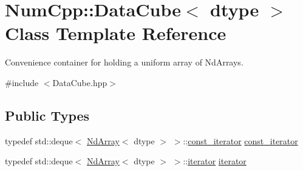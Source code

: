 \hypertarget{class_num_cpp_1_1_data_cube}{}\section{Num\+Cpp\+:\+:Data\+Cube$<$ dtype $>$ Class Template Reference}
\label{class_num_cpp_1_1_data_cube}


Convenience container for holding a uniform array of Nd\+Arrays.  




{\ttfamily \#include $<$Data\+Cube.\+hpp$>$}

\subsection*{Public Types}
\begin{DoxyCompactItemize}
\item 
typedef std\+::deque$<$ \mbox{\hyperlink{class_num_cpp_1_1_nd_array}{Nd\+Array}}$<$ dtype $>$ $>$\+::\mbox{\hyperlink{class_num_cpp_1_1_data_cube_a5916086d9b71149eaa35651e2212de39}{const\+\_\+iterator}} \mbox{\hyperlink{class_num_cpp_1_1_data_cube_a5916086d9b71149eaa35651e2212de39}{const\+\_\+iterator}}
\item 
typedef std\+::deque$<$ \mbox{\hyperlink{class_num_cpp_1_1_nd_array}{Nd\+Array}}$<$ dtype $>$ $>$\+::\mbox{\hyperlink{class_num_cpp_1_1_data_cube_a817f739957d3d426e8a19a66867674ba}{iterator}} \mbox{\hyperlink{class_num_cpp_1_1_data_cube_a817f739957d3d426e8a19a66867674ba}{iterator}}
\end{DoxyCompactItemize}
